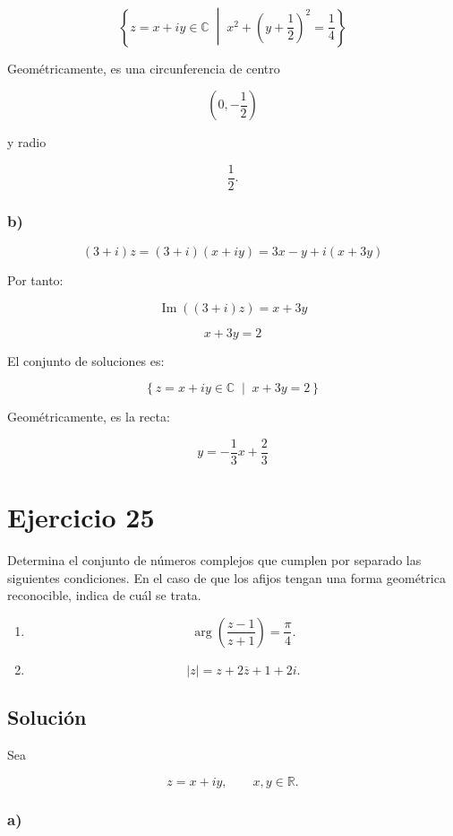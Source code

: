 \documentclass[fleqn]{article}
\begin{document}
		\[
		\boxed{
		\left\{
		z=x+iy\in\mathbb{C}
		\;\middle|\;
		x^2+\left(y+\frac{1}{2}\right)^2=\frac{1}{4}
		\right\}
		}
		\]

		Geométricamente, es una circunferencia de centro

		\[
		\left(0,-\frac{1}{2}\right)
		\]

		y radio

		\[
		\frac{1}{2}.
		\]

		\subsubsection*{b)}

		\[
		(3+i)z
		=
		(3+i)(x+iy)
		=
		3x-y+i(x+3y)
		\]

		Por tanto:

		\[
		\operatorname{Im}\left((3+i)z\right)
		=
		x+3y
		\]

		\[
		x+3y=2
		\]

		El conjunto de soluciones es:

		\[
		\boxed{
		\left\{
		z=x+iy\in\mathbb{C}
		\;\middle|\;
		x+3y=2
		\right\}
		}
		\]

		Geométricamente, es la recta:

		\[
		\boxed{
		y=-\frac{1}{3}x+\frac{2}{3}
		}
		\]

	\section{Ejercicio 25}
		Determina el conjunto de números complejos que cumplen por separado las siguientes condiciones. En el caso de que los afijos tengan una forma geométrica reconocible, indica de cuál se trata.

		\begin{enumerate}[label=\alph*)]
			\item
			\[
			\arg\left(\frac{z-1}{z+1}\right)=\frac{\pi}{4}.
			\]

			\item
			\[
			|z|=z+2\overline{z}+1+2i.
			\]
		\end{enumerate}

		\subsection{Solución}

		Sea

		\[
		z=x+iy,
		\qquad x,y\in\mathbb{R}.
		\]

		\subsubsection*{a)}
\end{document}
